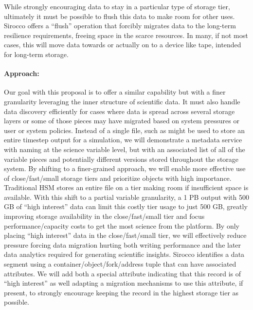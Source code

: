 While strongly encouraging data to stay in a particular type of storage tier,
ultimately it must be possible to flush this data to make room for other uses.
Sirocco offers a ``flush'' operation that forcibly migrates data to the
long-term resilience requirements, freeing space in the scarce resources. In
many, if not most cases, this will move data towards or actually on to a device
like tape, intended for long-term storage.

\paragraph{Approach:}
Our goal with this proposal is to offer a similar capability but with a finer
granularity leveraging the inner structure of scientific data. It must also
handle data discovery efficiently for cases where data is spread across several
storage layers or some of those pieces may have migrated based on system
pressures or user or system policies. Instead of a single file, such as might
be used to store an entire timestep output for a simulation, we will
demonstrate a metadata service with naming at the science variable level, but
with an associated list of all of the variable pieces and potentially different
versions stored throughout the storage system. By shifting to a finer-grained
approach, we will enable more effective use of close/fast/small storage tiers
and prioritize objects with high importance.  Traditional HSM stores an entire
file on a tier making room if insufficient space is available.  With this shift
to a partial variable granularity, a 1 PB output with 500 GB of ``high
interest'' data can limit this costly tier usage to just 500 GB, greatly
improving storage availability in the close/fast/small tier and focus
performance/capacity costs to get the most science from the platform.  By
only placing ``high interest'' data in the close/fast/small tier, we will
effectively reduce pressure forcing data migration hurting both writing
performance and the later data analytics required for generating scientific
insights.  Sirocco identifies a data segment using a
container/object/fork/address tuple that can have associated attributes. We will
add both a special attribute indicating that this record is of ``high
interest'' as well adapting a migration mechanisms to use this attribute, if
present, to strongly encourage keeping the record in  the highest storage tier as possible. 

